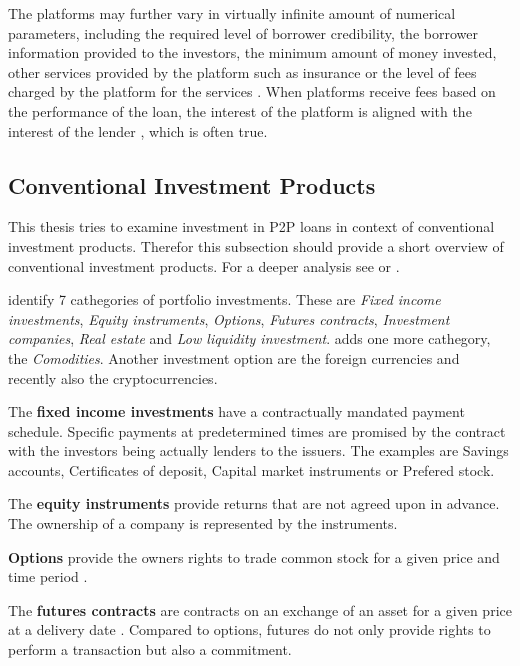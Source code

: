 The platforms may further vary in virtually infinite amount of numerical parameters, including the required level of borrower credibility, the borrower information provided to the investors, the minimum amount of money invested, other services provided by the platform such as insurance or the level of fees charged by the platform for the services \cite[]{Ashta2009, Bachmann2011, Fong2015}. When platforms receive fees based on the performance of the loan, the interest of the platform is aligned with the interest of the lender \cite[]{Fong2015}, which is often true.

\subsection{Conventional Investment Products}

This thesis tries to examine investment in P2P loans in context of conventional investment products. Therefor this subsection should provide a short overview of conventional investment products. For a deeper analysis see \cite{Reilly2000} or \cite{Zigraiova2010}.

\cite{Reilly2000} identify 7 cathegories of portfolio investments. These are \textit{Fixed income investments}, \textit{Equity instruments}, \textit{Options}, \textit{Futures contracts}, \textit{Investment companies}, \textit{Real estate} and \textit{Low liquidity investment}. \cite{Zigraiova2010} adds one more cathegory, the \textit{Comodities}. Another investment option are the foreign currencies and recently also the cryptocurrencies.

The \textbf{fixed income investments} have a contractually mandated payment schedule. Specific payments at predetermined times are promised by the contract with the investors being actually lenders to the issuers. The examples are Savings accounts, Certificates of deposit, Capital market instruments or Prefered stock. \cite[]{Reilly2000}

The \textbf{equity instruments} provide returns that are not agreed upon in advance. The ownership of a company is represented by the instruments. \cite[]{Reilly2000} 

\textbf{Options} provide the owners rights to trade common stock for a given price and time period \cite[]{Reilly2000}.

The \textbf{futures contracts} are contracts on an exchange of an asset for a given price at a delivery date \cite[]{Reilly2000}. Compared to options, futures do not only provide rights to perform a transaction but also a commitment.

